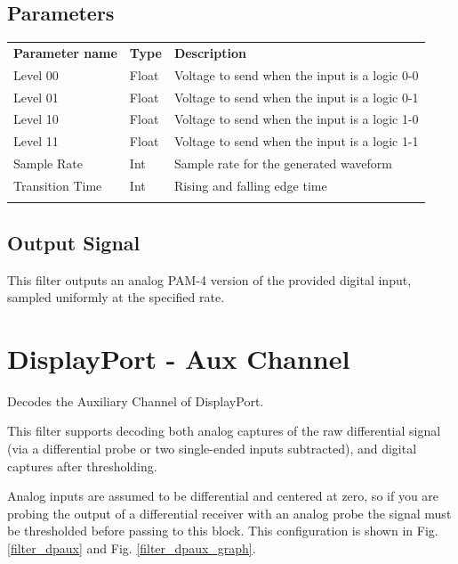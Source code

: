 \subsection{Parameters}

\begin{tabularx}{16cm}{llX}
\thickhline
\textbf{Parameter name} & \textbf{Type} & \textbf{Description} \\
\thickhline
Level 00 & Float & Voltage to send when the input is a logic 0-0\\
\thinhline
Level 01 & Float & Voltage to send when the input is a logic 0-1\\
\thinhline
Level 10 & Float & Voltage to send when the input is a logic 1-0\\
\thinhline
Level 11 & Float & Voltage to send when the input is a logic 1-1\\
\thinhline
Sample Rate & Int & Sample rate for the generated waveform\\
\thinhline
Transition Time & Int & Rising and falling edge time\\
\thickhline
\end{tabularx}

\subsection{Output Signal}

This filter outputs an analog PAM-4 version of the provided digital input, sampled uniformly at the specified rate.

\pagebreak
\section{DisplayPort - Aux Channel}
\label{filter:dpaux}

Decodes the Auxiliary Channel of DisplayPort.

This filter supports decoding both analog captures of the raw differential signal (via a differential probe or two
single-ended inputs subtracted), and digital captures after thresholding.

Analog inputs are assumed to be differential and centered at zero, so if you are probing the output of a differential
receiver with an analog probe the signal must be thresholded before passing to this block. This configuration is shown
in Fig. \ref{filter_dpaux} and Fig. \ref{filter_dpaux_graph}.

